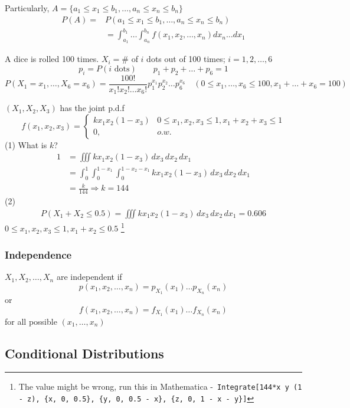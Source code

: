 Particularly, $A=\{a_1\leq x_1 \leq b_1,\dots,a_n\leq x_n \leq b_n\}$
\begin{align*}
P(A)=&P(a_1\leq x_1 \leq b_1,\dots,a_n\leq x_n \leq b_n)\\
&=\int_{a_1}^{b_1}\dots\int_{a_n}^{b_n} f(x_1,x_2,\dots,x_n) d x_n \dots d x_1
\end{align*}

\begin{exmp}
A dice is rolled 100 times. $X_i=$\# of $i$ dots out of 100 times; $i=1,2,\dots,6$
\[p_i=P(i \text{ dots}) \qquad p_1+p_2+\dots+p_6=1\]
\[P(X_1=x_1,\dots,X_6=x_6)=\frac{100!}{x_1!x_2!\dots x_6!}p_1^{x_1}p_2^{x_2}\dots p_6^{x_6} \quad(0\leq x_1,\dots,x_6 \leq 100, x_1+\dots+x_6=100)\]
\end{exmp}

\begin{exmp}
$(X_1,X_2,X_3)$ has the joint p.d.f
\[f(x_1,x_2,x_3)=\begin{cases}
kx_1 x_2(1-x_3)   & 0\leq x_1,x_2,x_3 \leq 1,x_1+x_2+x_3\leq 1\\
0, 		& o.w.
\end{cases}\]
(1) What is $k$?
\begin{align*}
1&=\iiint kx_1 x_2(1-x_3) \,dx_3 \,dx_2 \,dx_1 \\
&=\int_0^1 \int_0^{1-x_1} \int_{0}^{1-x_2-x_1} kx_1 x_2(1-x_3) \,dx_3 \,dx_2 \,dx_1 \\
&= \frac{k}{144} \Rightarrow k=144
\end{align*}
(2)
\begin{align*}
P(X_1+X_2 \leq 0.5)=\iiint kx_1 x_2(1-x_3) \,dx_3 \,dx_2 \,dx_1 =0.606
\end{align*}
$0\leq x_1,x_2,x_3 \leq 1, x_1+x_2 \leq 0.5$ \footnote{The value might be wrong, run this in Mathematica -\texttt{ Integrate[144*x y (1 - z), \{x, 0, 0.5\}, \{y, 0, 0.5 - x\}, \{z, 0, 1 - x - y\}]} }
\end{exmp}

\subsubsection{Independence}
\begin{defn}
$X_1,X_2,\dots,X_n$ are independent if 
\[p(x_1,x_2,\dots,x_n)=p_{X_1}(x_1)\dots p_{X_n}(x_n)\]
or
\[f(x_1,x_2,\dots,x_n)=f_{X_1}(x_1)\dots f_{X_n}(x_n)\]
for all possible $(x_1,\dots,x_n)$
\end{defn}

\subsection{Conditional Distributions}

